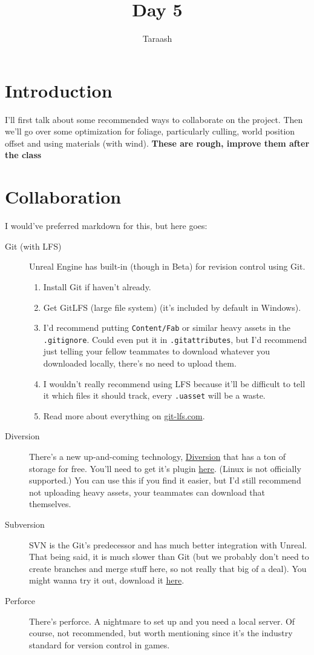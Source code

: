 \documentclass{article}
\title{Day 5}
\author{Taraash}
\date{}
\begin{document}
	\maketitle
	
	\section{Introduction}
	I'll first talk about some recommended ways to collaborate on the project. Then we'll go over some optimization for foliage, particularly culling, world position offset and using materials (with wind). \textbf{These are rough, improve them after the class}
	
	\section{Collaboration}
	I would've preferred markdown for this, but here goes:
	\begin{description}
		\item[Git (with LFS)] Unreal Engine has built-in (though in Beta) for revision control using Git. 
		\begin{enumerate}
			\item Install Git if haven't already.
			\item Get GitLFS (large file system) (it's included by default in Windows).
			\item I'd recommend putting \verb*|Content/Fab| or similar heavy assets in the \verb*|.gitignore|. Could even put it in \verb*|.gitattributes|, but I'd recommend just telling your fellow teammates to download whatever you downloaded locally, there's no need to upload them.
			\item I wouldn't really recommend using LFS because it'll be difficult to tell it which files it should track, every \verb*|.uasset| will be a waste.
			\item Read more about everything on \href{https://git-lfs.com/}{git-lfs.com}.
		\end{enumerate}
		\item[Diversion] There's a new up-and-coming technology, \href{https://www.diversion.dev/}{Diversion} that has a ton of storage for free. You'll need to get it's plugin \href{https://fab.com/s/2b880e6efd2a}{here}. (Linux is not officially supported.)
		You can use this if you find it easier, but I'd still recommend not uploading heavy assets, your teammates can download that themselves.
		\item[Subversion] SVN is the Git's predecessor and has much better integration with Unreal. That being said, it is much slower than Git (but we probably don't need to create branches and merge stuff here, so not really that big of a deal). You might wanna try it out, download it \href{https://subversion.apache.org/download.cgi}{here}.
		\item[Perforce] There's perforce. A nightmare to set up and you need a local server. Of course, not recommended, but worth mentioning since it's the industry standard for version control in games.
		   
	\end{description}
\end{document}
